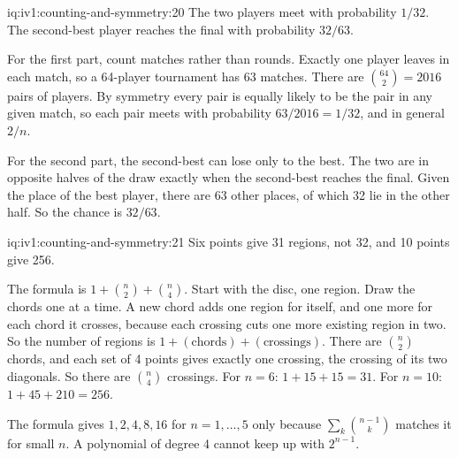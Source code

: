 \begin{solution}{iq:iv1:counting-and-symmetry:20}
The two players meet with probability $1/32$. The second-best player reaches the final with probability $32/63$.

For the first part, count matches rather than rounds. Exactly one player leaves in each match, so a 64-player tournament has 63 matches. There are $\binom{64}{2} = 2016$ pairs of players. By symmetry every pair is equally likely to be the pair in any given match, so each pair meets with probability $63/2016 = 1/32$, and in general $2/n$.

For the second part, the second-best can lose only to the best. The two are in opposite halves of the draw exactly when the second-best reaches the final. Given the place of the best player, there are 63 other places, of which 32 lie in the other half. So the chance is $32/63$.


\end{solution}

\begin{solution}{iq:iv1:counting-and-symmetry:21}
Six points give 31 regions, not 32, and 10 points give 256.

The formula is $1 + \binom{n}{2} + \binom{n}{4}$. Start with the disc, one region. Draw the chords one at a time. A new chord adds one region for itself, and one more for each chord it crosses, because each crossing cuts one more existing region in two. So the number of regions is $1 + (\text{chords}) + (\text{crossings})$. There are $\binom{n}{2}$ chords, and each set of 4 points gives exactly one crossing, the crossing of its two diagonals. So there are $\binom{n}{4}$ crossings. For $n = 6$: $1 + 15 + 15 = 31$. For $n = 10$: $1 + 45 + 210 = 256$.

The formula gives $1, 2, 4, 8, 16$ for $n = 1, \dots, 5$ only because $\sum_k \binom{n-1}{k}$ matches it for small $n$. A polynomial of degree 4 cannot keep up with $2^{n-1}$.

\end{solution}


